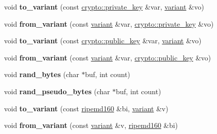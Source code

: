 \begin{DoxyCompactItemize}
\item 
\mbox{\label{namespacefc_aead4ca668f14d7fcd8af8c6bed225db1}} 
void {\bfseries to\+\_\+variant} (const \mbox{\hyperlink{classfc_1_1crypto_1_1private__key}{crypto\+::private\+\_\+key}} \&var, \mbox{\hyperlink{classfc_1_1variant}{variant}} \&vo)
\item 
\mbox{\label{namespacefc_adc484d79a7e739e6c29f978f564780bc}} 
void {\bfseries from\+\_\+variant} (const \mbox{\hyperlink{classfc_1_1variant}{variant}} \&var, \mbox{\hyperlink{classfc_1_1crypto_1_1private__key}{crypto\+::private\+\_\+key}} \&vo)
\item 
\mbox{\label{namespacefc_a9b59542b941d9390606c46ec18f16b06}} 
void {\bfseries to\+\_\+variant} (const \mbox{\hyperlink{classfc_1_1crypto_1_1public__key}{crypto\+::public\+\_\+key}} \&var, \mbox{\hyperlink{classfc_1_1variant}{variant}} \&vo)
\item 
\mbox{\label{namespacefc_aa1348e45c88190558af8348bd423a348}} 
void {\bfseries from\+\_\+variant} (const \mbox{\hyperlink{classfc_1_1variant}{variant}} \&var, \mbox{\hyperlink{classfc_1_1crypto_1_1public__key}{crypto\+::public\+\_\+key}} \&vo)
\item 
\mbox{\label{namespacefc_a76f700374df97faaacb54ebe324ca384}} 
void {\bfseries rand\+\_\+bytes} (char $\ast$buf, int count)
\item 
\mbox{\label{namespacefc_a8d34c190d618b348d9fa25849d2ff5c7}} 
void {\bfseries rand\+\_\+pseudo\+\_\+bytes} (char $\ast$buf, int count)
\item 
\mbox{\label{namespacefc_a683135bfd00047a0c87a47a8a9a8e09b}} 
void {\bfseries to\+\_\+variant} (const \mbox{\hyperlink{classfc_1_1ripemd160}{ripemd160}} \&bi, \mbox{\hyperlink{classfc_1_1variant}{variant}} \&v)
\item 
\mbox{\label{namespacefc_a519e5f82e87b49399ce419fccfb7b1ab}} 
void {\bfseries from\+\_\+variant} (const \mbox{\hyperlink{classfc_1_1variant}{variant}} \&v, \mbox{\hyperlink{classfc_1_1ripemd160}{ripemd160}} \&bi)
\item 
\mbox{\label{namespacefc_a13cd0d801470e15d2c9814cc2542d554}} 

\end{DoxyCompactItemize}
